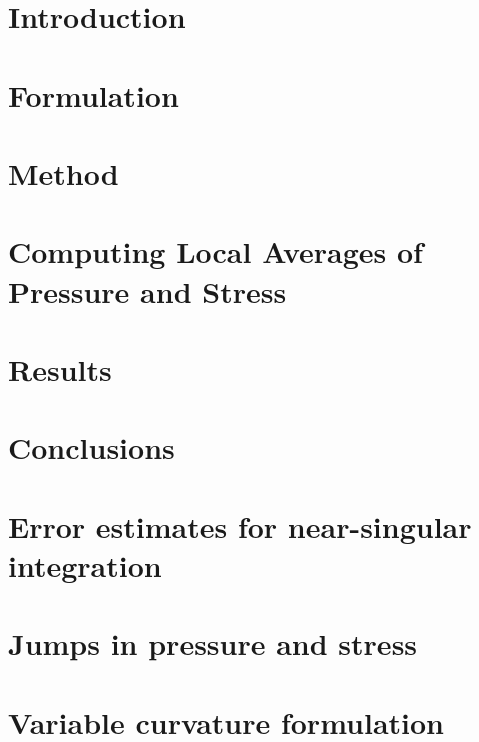 \documentclass[preprint, 10pt]{elsarticle}
\begin{document}
\maketitle

\section{Introduction\label{s:intro}}


\section{Formulation\label{s:formulation}} 


\section{Method\label{s:method}} 


\section{Computing Local Averages of Pressure and Stress\label{s:aver}}


\section{Results\label{s:results}} 


\section{Conclusions\label{s:conclusions}}



\begin{appendices}
\section{Error estimates for near-singular integration \label{A:AppendixA}} 


\section{Jumps in pressure and stress \label{A:AppendixB}} 


\section{Variable curvature formulation \label{A:AppendixC}}

\end{appendices}


 

\end{document}
